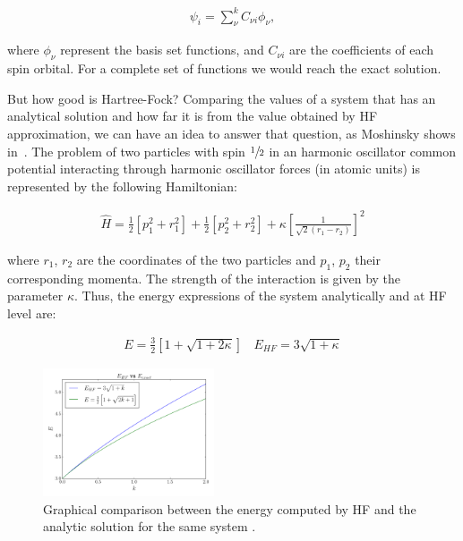 %
\begin{align}
\psi_{i} = \sum_{\nu}^k C_{\nu i}\phi_{\nu},
\end{align}

\noindent where ${\phi_{\nu}}$ represent the basis set functions, and $C_{\nu
i}$ are the coefficients of each spin orbital. For a complete set of functions
we would reach the exact solution.

\newpage

But how good is Hartree-Fock? Comparing the values of a system that has an
analytical solution and how far it is from the value obtained by HF
approximation, we can have an idea to answer that question, as Moshinsky shows
in~. The problem of two particles with spin $\sfrac{1}{2}$
in an harmonic oscillator common potential interacting through harmonic
oscillator forces (in atomic units) is represented by the following
Hamiltonian:

\begin{align}
\widehat{H} = \frac12 [p_1^2 + r_1^2] + \frac12[p_2^2 + r_2^2]
       + \kappa\left[\frac{1}{\sqrt{2}(r_1 - r_2)}\right]^2
\end{align}

\noindent where $r_1$, $r_2$ are the coordinates of the two particles and
$p_1$, $p_2$ their corresponding momenta. The strength of the interaction is
given by the parameter $\kappa$. Thus, the energy expressions of the system analytically and
at HF level are:

\begin{align}
E= \frac32 \left[ 1 + \sqrt{1+2\kappa}\right] \ \ \ \
E_{HF} = 3\sqrt{1+\kappa}
\end{align}

\begin{figure}
    \centering
    \includegraphics[width=0.45\textwidth]{3/img/HF_vs_excat}
    \caption{Graphical comparison between the energy computed by HF and the analytic solution
    for the same system \cite{Moshinsky}.}
\label{HF_vs_excat}
\end{figure}

